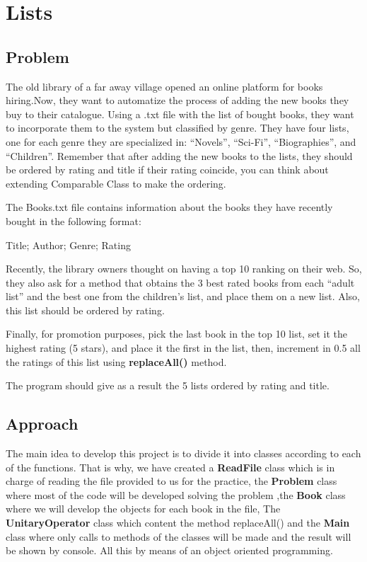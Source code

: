 \documentclass[a4paper]{article}
\theoremstyle{plain}
\theoremstyle{definition}
\begin{document}
	\section{Lists}
	    \subsection{Problem}
	    The old library of a far away village opened an online platform for books hiring.Now, they want to automatize the process of adding the new books they buy to their catalogue. Using a .txt file with the list of bought books, they want to incorporate them to the system but classified by genre. They have four lists, one for each genre they are specialized in: “Novels”, “Sci-Fi”, “Biographies”, and “Children”. Remember that after adding the new books to the lists, they should be ordered by rating and title if their rating coincide, you can think about extending Comparable Class to make the ordering.\newline
	    
        The Books.txt file contains information about the books they have recently bought in the following format:\newline
            \begin{center}
                Title; Author; Genre; Rating\newline
            \end{center}
    
        Recently, the library owners thought on having a top 10 ranking on their web. So, they also ask for a method that obtains the 3 best rated books from each “adult list” and the best one from the children’s list, and place them on a new list. Also, this list should be ordered by rating.\newline
        
        Finally, for promotion purposes, pick the last book in the top 10 list, set it the highest rating (5 stars), and place
        it the first in the list, then, increment in 0.5 all the ratings of this list using \textbf{replaceAll()} method.\par
        
        The program should give as a result the 5 lists ordered by rating and title.\par

    \subsection{Approach}
	    The main idea to develop this project is to divide it into classes according to each of the functions. That is why, we have created a \textbf{ReadFile} class which is in charge of reading the file provided to us for the practice, the \textbf{Problem} class where most of the code will be developed solving the problem ,the \textbf{Book} class where we will develop the objects for each book in the file, The \textbf{UnitaryOperator} class which content the method replaceAll() and the \textbf{Main} class where only calls to methods of the classes will be made and the result will be shown by console. All this by means of an object oriented programming.
	    
\end{document}
